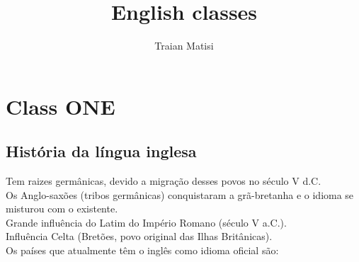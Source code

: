 \documentclass[12pt,a4paper]{article} %
\title{English classes}
\author{Traian Matisi}
\begin{document}
\maketitle
\section{Class ONE}
\subsection{História da língua inglesa}

Tem raizes germânicas, devido a migração desses povos no século V d.C.\\
Os Anglo-saxões (tribos germânicas) conquistaram a grã-bretanha e o idioma se misturou com o existente.\\
Grande influência do Latim do Império Romano (século V a.C.).\\
Influência Celta (Bretões, povo original das Ilhas Britânicas).\\
Os países que atualmente têm o inglês como idioma oficial são:
\end{document}
